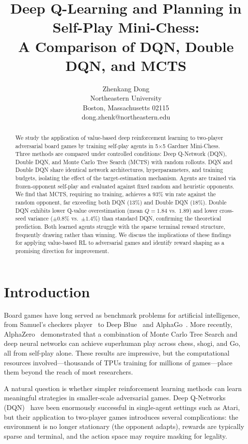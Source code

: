 \documentclass[letterpaper]{article}
\title{Deep Q-Learning and Planning in Self-Play Mini-Chess:\\A Comparison of DQN, Double DQN, and MCTS}
\author{Zhenkang Dong\\
Northeastern University\\
Boston, Massachusetts 02115\\
dong.zhenk@northeastern.edu}
\begin{document}
\maketitle

\begin{abstract}
We study the application of value-based deep reinforcement learning to two-player adversarial board games by training self-play agents in 5$\times$5 Gardner Mini-Chess.
Three methods are compared under controlled conditions: Deep Q-Network (DQN), Double DQN, and Monte Carlo Tree Search (MCTS) with random rollouts.
DQN and Double DQN share identical network architectures, hyperparameters, and training budgets, isolating the effect of the target-estimation mechanism.
Agents are trained via frozen-opponent self-play and evaluated against fixed random and heuristic opponents.
We find that MCTS, requiring no training, achieves a 93\% win rate against the random opponent, far exceeding both DQN (13\%) and Double DQN (18\%).
Double DQN exhibits lower Q-value overestimation (mean $Q = 1.84$ vs.\ $1.89$) and lower cross-seed variance ($\pm 0.8\%$ vs.\ $\pm 1.4\%$) than standard DQN, confirming the theoretical prediction.
Both learned agents struggle with the sparse terminal reward structure, frequently drawing rather than winning.
We discuss the implications of these findings for applying value-based RL to adversarial games and identify reward shaping as a promising direction for improvement.
\end{abstract}


\section{Introduction}

Board games have long served as benchmark problems for artificial intelligence, from Samuel's checkers player~\cite{samuel1959} to Deep Blue~\cite{campbell2002} and AlphaGo~\cite{silver2016mastering}.
More recently, AlphaZero~\cite{silver2018general} demonstrated that a combination of Monte Carlo Tree Search and deep neural networks can achieve superhuman play across chess, shogi, and Go, all from self-play alone.
These results are impressive, but the computational resources involved---thousands of TPUs training for millions of games---place them beyond the reach of most researchers.

A natural question is whether simpler reinforcement learning methods can learn meaningful strategies in smaller-scale adversarial games.
Deep Q-Networks (DQN)~\cite{mnih2015human} have been enormously successful in single-agent settings such as Atari, but their application to two-player games introduces several complications: the environment is no longer stationary (the opponent adapts), rewards are typically sparse and terminal, and the action space may require masking for legality.
\end{document}
